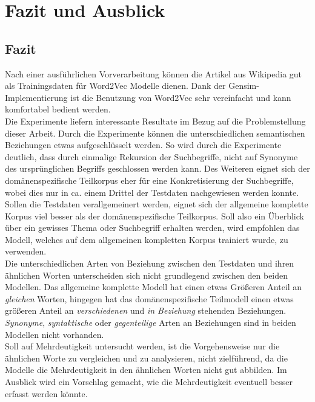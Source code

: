 \documentclass[12pt,a4paper]{report}
\begin{document}
\newpage
\chapter{Fazit und Ausblick}
\section{Fazit}
Nach einer ausführlichen Vorverarbeitung können die Artikel aus Wikipedia gut als Trainingsdaten für Word2Vec Modelle dienen. Dank der Gensim-Implementierung ist die Benutzung von Word2Vec sehr vereinfacht und kann komfortabel bedient werden.\\
Die Experimente liefern interessante Resultate im Bezug auf die Problemstellung dieser Arbeit. Durch die Experimente können die unterschiedlichen semantischen Beziehungen etwas aufgeschlüsselt werden.
So wird durch die Experimente deutlich, dass durch einmalige Rekursion der Suchbegriffe, nicht auf Synonyme des ursprünglichen Begriffs geschlossen werden kann. Des Weiteren eignet sich der domänenspezifische Teilkorpus eher für eine Konkretisierung der Suchbegriffe, wobei dies nur in ca. einem Drittel der Testdaten nachgewiesen werden konnte. \\
Sollen die Testdaten verallgemeinert werden, eignet sich der allgemeine komplette Korpus viel besser als der domänenspezifische Teilkorpus. Soll also ein Überblick über ein gewisses Thema oder Suchbegriff erhalten werden, wird empfohlen das Modell, welches auf dem allgemeinen kompletten Korpus trainiert wurde, zu verwenden.\\
Die unterschiedlichen Arten von Beziehung zwischen den Testdaten und ihren ähnlichen Worten unterscheiden sich nicht grundlegend zwischen den beiden Modellen. Das allgemeine komplette Modell hat einen etwas Größeren Anteil an \textit{gleichen} Worten, hingegen hat das domänenspezifische Teilmodell einen etwas größeren Anteil an \textit{verschiedenen} und \textit{in Beziehung} stehenden Beziehungen. \textit{Synonyme}, \textit{syntaktische} oder \textit{gegenteilige} Arten an Beziehungen sind in beiden Modellen nicht vorhanden.\\
Soll auf Mehrdeutigkeit untersucht werden, ist die Vorgehensweise nur die ähnlichen Worte zu vergleichen und zu analysieren, nicht zielführend, da die Modelle die Mehrdeutigkeit in den ähnlichen Worten nicht gut abbilden. Im Ausblick wird ein Vorschlag gemacht, wie die Mehrdeutigkeit eventuell besser erfasst werden könnte.\\
\end{document}
